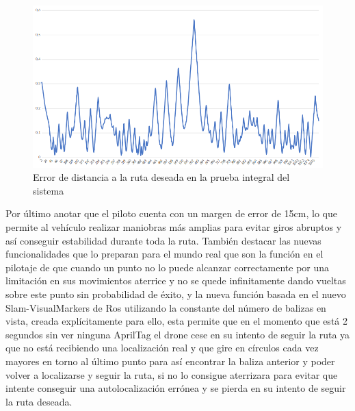 \begin{figure}[H]
	\begin{center}
		\includegraphics[width=1\textwidth]{imag/IMG44.png}
				\caption{Error de distancia a la ruta deseada en la prueba integral del sistema}
		\label{fig:Error de distancia final.}	
	\end{center}
\end{figure}

\hspace{1cm} Por último anotar que el piloto cuenta con un margen de error de 15cm, lo que permite al vehículo realizar maniobras más amplias para evitar giros abruptos y así conseguir estabilidad durante toda la ruta. También destacar las nuevas funcionalidades que lo preparan para el mundo real que son la función en el pilotaje de que cuando un punto no lo puede alcanzar correctamente por una limitación en sus movimientos aterrice y no se quede infinitamente dando vueltas sobre este punto sin probabilidad de éxito, y la nueva función basada en el nuevo Slam-VisualMarkers de Ros utilizando la constante del número de balizas en vista, creada explícitamente para ello, esta permite que en el momento que está 2 segundos sin ver ninguna AprilTag el drone cese en su intento de seguir la ruta ya que no está recibiendo una localización real y que gire en círculos cada vez mayores en torno al último punto para así encontrar la baliza anterior y poder volver a localizarse y seguir la ruta, si no lo consigue aterrizara para evitar que intente conseguir una autolocalización errónea y se pierda en su intento de seguir la ruta deseada.